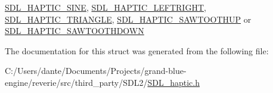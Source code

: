 \mbox{\hyperlink{_s_d_l__haptic_8h_aa6d75adbfcdda5075078e7a2849da5c0}{S\+D\+L\+\_\+\+H\+A\+P\+T\+I\+C\+\_\+\+S\+I\+NE}}, \mbox{\hyperlink{_s_d_l__haptic_8h_ae047624d8458ff6400887c37a36f86d3}{S\+D\+L\+\_\+\+H\+A\+P\+T\+I\+C\+\_\+\+L\+E\+F\+T\+R\+I\+G\+HT}}, \mbox{\hyperlink{_s_d_l__haptic_8h_ae8123eaa51511507375ba6ef9220fa46}{S\+D\+L\+\_\+\+H\+A\+P\+T\+I\+C\+\_\+\+T\+R\+I\+A\+N\+G\+LE}}, \mbox{\hyperlink{_s_d_l__haptic_8h_ab8e3f40f3c2bcee8905d13b634363c3f}{S\+D\+L\+\_\+\+H\+A\+P\+T\+I\+C\+\_\+\+S\+A\+W\+T\+O\+O\+T\+H\+UP}} or \mbox{\hyperlink{_s_d_l__haptic_8h_afd64aa747034a7ccf4b55f6246525701}{S\+D\+L\+\_\+\+H\+A\+P\+T\+I\+C\+\_\+\+S\+A\+W\+T\+O\+O\+T\+H\+D\+O\+WN}} 

The documentation for this struct was generated from the following file\+:\begin{DoxyCompactItemize}
\item 
C\+:/\+Users/dante/\+Documents/\+Projects/grand-\/blue-\/engine/reverie/src/third\+\_\+party/\+S\+D\+L2/\mbox{\hyperlink{_s_d_l__haptic_8h}{S\+D\+L\+\_\+haptic.\+h}}\end{DoxyCompactItemize}
